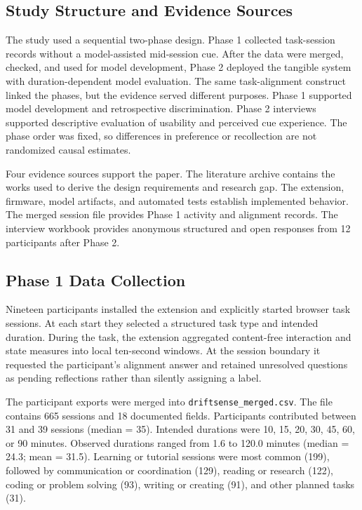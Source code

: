 \documentclass[12pt,a4paper]{article}
\begin{document}
\subsection{Study Structure and Evidence Sources}

The study used a sequential two-phase design. Phase 1 collected task-session records without a model-assisted mid-session cue. After the data were merged, checked, and used for model development, Phase 2 deployed the tangible system with duration-dependent model evaluation. The same task-alignment construct linked the phases, but the evidence served different purposes. Phase 1 supported model development and retrospective discrimination. Phase 2 interviews supported descriptive evaluation of usability and perceived cue experience. The phase order was fixed, so differences in preference or recollection are not randomized causal estimates.

Four evidence sources support the paper. The literature archive contains the works used to derive the design requirements and research gap. The extension, firmware, model artifacts, and automated tests establish implemented behavior. The merged session file provides Phase 1 activity and alignment records. The interview workbook provides anonymous structured and open responses from 12 participants after Phase 2.

\subsection{Phase 1 Data Collection}

Nineteen participants installed the extension and explicitly started browser task sessions. At each start they selected a structured task type and intended duration. During the task, the extension aggregated content-free interaction and state measures into local ten-second windows. At the session boundary it requested the participant's alignment answer and retained unresolved questions as pending reflections rather than silently assigning a label.

The participant exports were merged into \texttt{driftsense\_merged.csv}. The file contains 665 sessions and 18 documented fields. Participants contributed between 31 and 39 sessions (median = 35). Intended durations were 10, 15, 20, 30, 45, 60, or 90 minutes. Observed durations ranged from 1.6 to 120.0 minutes (median = 24.3; mean = 31.5). Learning or tutorial sessions were most common (199), followed by communication or coordination (129), reading or research (122), coding or problem solving (93), writing or creating (91), and other planned tasks (31).
\end{document}
